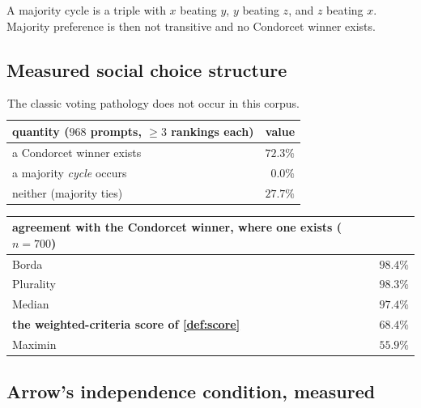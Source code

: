 \begin{definition}
A majority cycle is a triple with $x$ beating $y$, $y$ beating $z$, and $z$
beating $x$. Majority preference is then not transitive and no Condorcet winner
exists.
\end{definition}

\subsection{Measured social choice structure}

\begin{table}[H]\centering\small
\begin{tabular}{lr}
\toprule
quantity ($968$ prompts, $\ge 3$ rankings each) & value \\
\midrule
a Condorcet winner exists & $72.3\%$\\
a majority \emph{cycle} occurs & $\mathbf{0.0\%}$\\
neither (majority ties) & $27.7\%$\\
\bottomrule
\end{tabular}
\caption{The classic voting pathology does not occur in this corpus.}
\label{tab:condorcet}
\end{table}

\begin{table}[H]\centering\small
\begin{tabular}{lr}
\toprule
agreement with the Condorcet winner, where one exists ($n=700$) & \\
\midrule
Borda & $98.4\%$\\
Plurality & $98.3\%$\\
Median & $97.4\%$\\
\textbf{the weighted-criteria score of \cref{def:score}} & $\mathbf{68.4\%}$\\
Maximin & $55.9\%$\\
\bottomrule
\end{tabular}
\label{tab:agree}
\end{table}


\subsection{Arrow's independence condition, measured}

